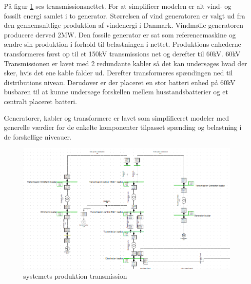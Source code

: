 På figur \ref{fig:SimTrans} ses transmissionsnettet. For at simplificer modelen er alt vind- og fossilt energi samlet i to generator. Størrelsen af vind generatoren er valgt ud fra den gennemsnitlige produktion af vindenergi i Danmark. Vindmølle generatoren producere derved 2MW. Den fossile generator er sat som referencemaskine og ændre sin produktion i forhold til belastningen i nettet. Produktions enhederne transformeres først op til et 150kV transmissions net og derefter til 60kV. 60kV Transmissionen er lavet med 2 redundante kabler så det kan undersøges hvad der sker, hvis det ene kable falder ud. Derefter transformeres spændingen ned til distributions niveau. Derudover er der placeret en stor batteri enhed på 60kV busbaren til at kunne undersøge forskellen mellem husstandsbatterier og et centralt placeret batteri.

Generatorer, kabler og transformere er lavet som simplificeret modeler med generelle værdier for de enkelte komponenter tilpasset spænding og belastning i de forskellige niveauer.
 

\begin{figure}[H] %
	\centering
	\includegraphics[width=1\textwidth]{figurer/Sim_model_1}
	\caption{systemets produktion transmission}
	\label{fig:SimTrans}
\end{figure}
